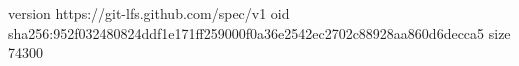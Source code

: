 version https://git-lfs.github.com/spec/v1
oid sha256:952f032480824ddf1e171ff259000f0a36e2542ec2702c88928aa860d6decca5
size 74300
